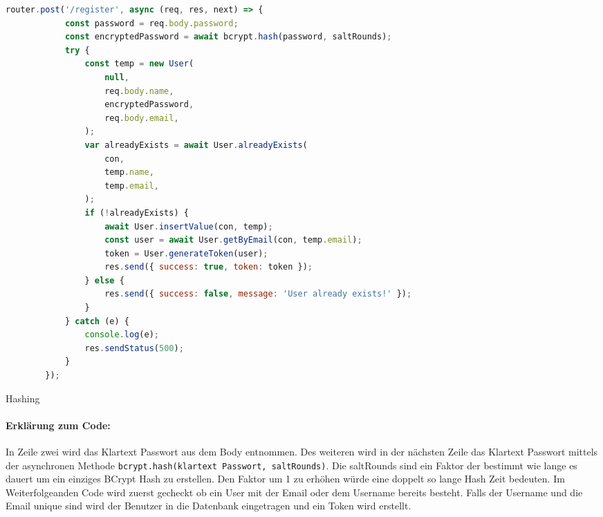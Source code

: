\begin{code}[H]
    \begin{lstlisting}[firstnumber=1,language=JavaScript, style=CMD]
        router.post('/register', async (req, res, next) => {
            const password = req.body.password;
            const encryptedPassword = await bcrypt.hash(password, saltRounds);
            try {
                const temp = new User(
                    null,
                    req.body.name,
                    encryptedPassword,
                    req.body.email,
                );
                var alreadyExists = await User.alreadyExists(
                    con,
                    temp.name,
                    temp.email,
                );
                if (!alreadyExists) {
                    await User.insertValue(con, temp);
                    const user = await User.getByEmail(con, temp.email);
                    token = User.generateToken(user);
                    res.send({ success: true, token: token });
                } else {
                    res.send({ success: false, message: 'User already exists!' });
                }
            } catch (e) {
                console.log(e);
                res.sendStatus(500);
            }
        });
    \end{lstlisting}
    \caption{Hashing}
\end{code}

\paragraph{Erklärung zum Code:}
In Zeile zwei wird das Klartext Passwort aus dem Body entnommen. Des weiteren
wird in der nächsten Zeile das Klartext Passwort mittels der asynchronen Methode
\texttt{bcrypt.hash(klartext Passwort, saltRounds)}. Die saltRounds sind ein
Faktor der bestimmt wie lange es dauert um ein einziges BCrypt Hash zu erstellen.
Den Faktor um 1 zu erhöhen würde eine doppelt so lange Hash Zeit bedeuten.
Im Weiterfolgeanden Code wird zuerst gecheckt ob ein User mit der Email oder dem Username bereits
besteht. Falls der Username und die Email unique sind wird der Benutzer
in die Datenbank eingetragen und ein Token \underline{} wird erstellt.
\cite{MySQL}
\label{db}

